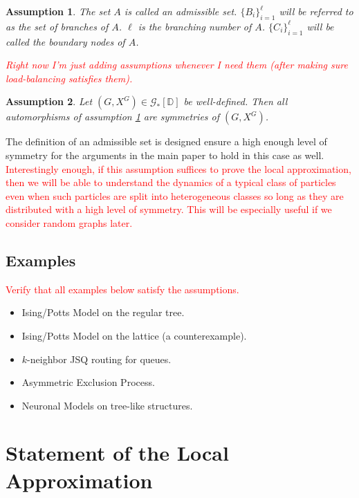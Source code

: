 \documentclass[12pt]{article}
\newcommand{\mb}{\mathbb}
\newcommand{\mc}{\mathcal}
\newcommand{\tr}{\textcolor{red}}
\newcommand{\ind}{\hspace{24pt}}
\newcommand{\cad}{\mb{D}}							%
\newcommand{\Xf}{X}									%
\newcommand{\gind}[1]{^{#1}}						%
\newcommand{\psize}{\ell}							%
\newcommand{\Gs}{\mc{G}_\ast}						%
\renewcommand{\sp}[1]{[#1]}							%
\newtheorem{assu}{Assumption}
\begin{document}
\begin{assu}
The set \(A\) is called an admissible set. \(\{B_i\}_{i=1}^\psize\) will be referred to as the set of branches of \(A\). \(\psize\) is the branching number of \(A\). \(\{C_i\}_{i=1}^\psize\) will be called the boundary nodes of \(A\).

\ind \tr{Right now I'm just adding assumptions whenever I need them (after making sure load-balancing satisfies them).}
\label{a::admissible}
\end{assu}

\begin{assu}
Let \((G,\Xf\gind{G}) \in \Gs\sp{\cad}\) be well-defined. Then all automorphisms of assumption \ref{a::admissible} are symmetries of \((G,\Xf\gind{G})\).
\label{a::padmin}
\end{assu}

The definition of an admissible set is designed ensure a high enough level of symmetry for the arguments in the main paper to hold in this case as well. \tr{Interestingly enough, if this assumption suffices to prove the local approximation, then we will be able to understand the dynamics of a typical class of particles even when such particles are split into heterogeneous classes so long as they are distributed with a high level of symmetry. This will be especially useful if we consider random graphs later.}

\subsection{Examples}
\label{e::not}

\tr{Verify that all examples below satisfy the assumptions. }

\begin{itemize}
\item Ising/Potts Model on the regular tree.

\item Ising/Potts Model on the lattice (a counterexample).

\item \(k\)-neighbor JSQ routing for queues.

\item Asymmetric Exclusion Process.

\item Neuronal Models on tree-like structures.
\end{itemize}


\section{Statement of the Local Approximation}
\label{Main}
\end{document}

